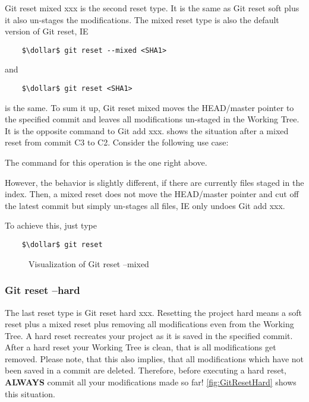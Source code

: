 Git reset mixed xxx is the second reset type. It is the same as Git reset soft plus it also un-stages the modifications.
The mixed reset type is also the default version of Git reset, \ac{IE} 
\begin{lstlisting}
	$\dollar$ git reset --mixed <SHA1>  
\end{lstlisting}
and
\begin{lstlisting}
	$\dollar$ git reset <SHA1>
\end{lstlisting}
is the same. To sum it up, Git reset mixed moves the HEAD/master pointer to the specified commit and leaves all modifications
un-staged in the Working Tree. It is the opposite command to Git add xxx.  shows the situation after a mixed 
reset from commit C3 to C2. Consider the following use case:
\\


The command for this operation is the one right above.

However, the behavior is slightly different, if there are currently files staged in the index. Then, a mixed reset does not move the HEAD/master
pointer and cut off the latest commit but simply un-stages all files, \ac{IE} only undoes Git add xxx.
\\


To achieve this, just type 
\begin{lstlisting}
	$\dollar$ git reset 
\end{lstlisting}  
\begin{figure}[H]
	\centering
	
	\caption{Visualization of Git reset --mixed}
	\label{fig:GitResetMixed}
\end{figure}




\subsubsection*{Git reset --hard}

The last reset type is Git reset hard xxx. Resetting the project hard means a soft reset plus a mixed reset plus removing all
modifications even from the Working Tree. A hard reset recreates your project as it is saved in the specified commit. After a hard reset
your Working Tree is clean, that is all modifications get removed. Please note, that this also implies, that all modifications which have 
not been saved in a commit are deleted. Therefore, before executing a hard reset, \textbf{ALWAYS} commit all your modifications made so far!
\cref{fig:GitResetHard} shows this situation.

